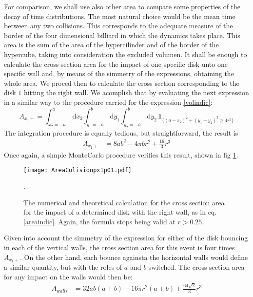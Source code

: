 \documentclass[a4paper,10pt, jcp, aps, preprint]{revtex4-1}
\newcommand{\rd}{\, \mathrm{d}}
\newcommand{\indicator}[1]{\mathbf{1}_{ \{   #1 \} } }
\begin{document}
For comparison, we shall use also other area to compare
some properties of the decay of time distributions. The most natural choice
would be the mean time between any two collisions. This corresponds
to the adequate measure of the border of the four dimensional
billiard in which the dynamics takes place. This area is
the sum of the area of the hypercilinder and of the border of the
hypercube, taking into consideration the excluded volumen. 
It shall be enough to calculate the cross section area for
the impact of one specific disk unto one specific wall and,
by means of the simmetry of the expressions, obtaining the whole
area. We proced then to calculate the cross section corresponding to 
the disk $1$ hitting the right wall. We acomplish that by
evaluating the next expression in a similar way to
the procedure carried for the expression \ref{volindic}:
\begin{equation}\label{areaindic}
 A_{x_1+} =  \int_{x_2 = -a}^a \rd x_2 
\int_{y_1 = -b}^b \rd y_1 \int_{y_2 = -b}^b \rd y_2 \, \indicator{ (a-x_2)^2 + (y_1-y_2)^2 \ge 4 r^2 }
\end{equation}
The integration procedure is equally tedious, but
straightforward, the result is 
\begin{align}\label{areax1p}
 A_{x_1+} & = 8 a b^2-4  \pi b r^2 +\frac{16}{3}r^3 
\end{align}
Once again, a simple MonteCarlo procedure verifies this result,
shown in fig \ref{area1derecha}. 

\begin{figure}
\centering
\texttt{[image: AreaColisionpx1p01.pdf]}
\caption{The numerical and theoretical calculation for the cross section area
for the impact of a determined disk with the right wall, as in eq. \ref{areaindic}.
Again, the formula stops being valid at $r>0.25$. }
\label{area1derecha}.
\end{figure}

Given into account the simmetry of the expression for either of 
the disk bouncing in each of the vertical walls, the
cross section area for this event is four times $A_{x_1+}$. On
the other hand, each bounce againsta the horizontal walls would
define a similar quantity, but with the roles of $a$ and $b$ switched.
The cross section area for any impact on the walls would then be:
\begin{align}\label{areawalls}
 A_{walls} & = 32 a b (a+b)-16 \pi r^2 (a+b) +\frac{64\sqrt{2}}{3}r^3 
\end{align}
\end{document}
